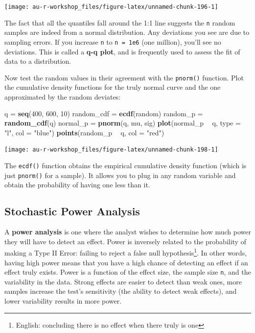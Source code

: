 \documentclass[]{book}
\newenvironment{Shaded}{\begin{snugshade}}{\end{snugshade}}
\newcommand{\KeywordTok}[1]{\textcolor[rgb]{0.13,0.29,0.53}{\textbf{#1}}}
\newcommand{\DataTypeTok}[1]{\textcolor[rgb]{0.13,0.29,0.53}{#1}}
\newcommand{\DecValTok}[1]{\textcolor[rgb]{0.00,0.00,0.81}{#1}}
\newcommand{\StringTok}[1]{\textcolor[rgb]{0.31,0.60,0.02}{#1}}
\newcommand{\OperatorTok}[1]{\textcolor[rgb]{0.81,0.36,0.00}{\textbf{#1}}}
\newcommand{\NormalTok}[1]{#1}
\let\rmarkdownfootnote\footnote%
\def\footnote{\protect\rmarkdownfootnote}
\theoremstyle{definition}
\theoremstyle{definition}
\theoremstyle{definition}
\theoremstyle{remark}
\begin{document}
\begin{center}\texttt{[image: au-r-workshop\_files/figure-latex/unnamed-chunk-196-1]} \end{center}

The fact that all the quantiles fall around the 1:1 line suggests the
\texttt{n} random samples are indeed from a normal distribution. Any
deviations you see are due to sampling errors. If you increase
\texttt{n} to \texttt{n\ =\ 1e6} (one million), you'll see no
deviations. This is called a \textbf{q-q plot}, and is frequently used
to assess the fit of data to a distribution.

Now test the random values in their agreement with the \texttt{pnorm()}
function. Plot the cumulative density functions for the truly normal
curve and the one approximated by the random deviates:

\begin{Shaded}
\begin{Highlighting}[]
\NormalTok{q =}\StringTok{ }\KeywordTok{seq}\NormalTok{(}\DecValTok{400}\NormalTok{, }\DecValTok{600}\NormalTok{, }\DecValTok{10}\NormalTok{)}
\NormalTok{random_cdf =}\StringTok{ }\KeywordTok{ecdf}\NormalTok{(random)}
\NormalTok{random_p =}\StringTok{ }\KeywordTok{random_cdf}\NormalTok{(q)}
\NormalTok{normal_p =}\StringTok{ }\KeywordTok{pnorm}\NormalTok{(q, mu, sig)}
\KeywordTok{plot}\NormalTok{(normal_p }\OperatorTok{~}\StringTok{ }\NormalTok{q, }\DataTypeTok{type =} \StringTok{"l"}\NormalTok{, }\DataTypeTok{col =} \StringTok{"blue"}\NormalTok{)}
\KeywordTok{points}\NormalTok{(random_p }\OperatorTok{~}\StringTok{ }\NormalTok{q, }\DataTypeTok{col =} \StringTok{"red"}\NormalTok{)}
\end{Highlighting}
\end{Shaded}

\begin{center}\texttt{[image: au-r-workshop\_files/figure-latex/unnamed-chunk-198-1]} \end{center}

The \texttt{ecdf()} function obtains the empirical cumulative density
function (which is just \texttt{pnorm()} for a sample). It allows you to
plug in any random variable and obtain the probability of having one
less than it.

\subsection{Stochastic Power Analysis}\label{power-ex}

A \textbf{power analysis} is one where the analyst wishes to determine
how much power they will have to detect an effect. Power is inversely
related to the probability of making a Type II Error: failing to reject
a false null hypothesis\footnote{English: concluding there is no effect
  when there truly is one}. In other words, having high power means that
you have a high chance of detecting an effect if an effect truly exists.
Power is a function of the effect size, the sample size \texttt{n}, and
the variability in the data. Strong effects are easier to detect than
weak ones, more samples increase the test's sensitivity (the ability to
detect weak effects), and lower variability results in more power.
\end{document}
